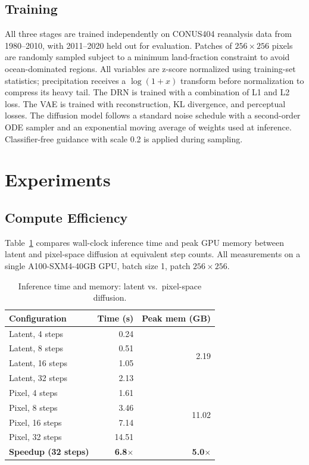 \documentclass[10pt]{article}
\begin{document}
\subsection{Training}

All three stages are trained independently on CONUS404 reanalysis data from 1980--2010, with 2011--2020 held out for evaluation. Patches of $256\times256$ pixels are randomly sampled subject to a minimum land-fraction constraint to avoid ocean-dominated regions. All variables are z-score normalized using training-set statistics; precipitation receives a $\log(1+x)$ transform before normalization to compress its heavy tail. The DRN is trained with a combination of L1 and L2 loss. The VAE is trained with reconstruction, KL divergence, and perceptual losses. The diffusion model follows a standard noise schedule with a second-order ODE sampler and an exponential moving average of weights used at inference. Classifier-free guidance with scale 0.2 is applied during sampling.

\section{Experiments}

\subsection{Compute Efficiency}
\label{sec:benchmark}

Table~\ref{tab:benchmark} compares wall-clock inference time and peak GPU memory between latent and pixel-space diffusion at equivalent step counts. All measurements on a single A100-SXM4-40GB GPU, batch size 1, patch $256\times256$.

\begin{table}[h]
\centering
\caption{Inference time and memory: latent vs.\ pixel-space diffusion.}
\label{tab:benchmark}
\begin{tabular}{lrr}
\toprule
Configuration & Time (s) & Peak mem (GB) \\
\midrule
Latent, 4 steps  & 0.24 & \multirow{4}{*}{2.19} \\
Latent, 8 steps  & 0.51 & \\
Latent, 16 steps & 1.05 & \\
Latent, 32 steps & 2.13 & \\
\midrule
Pixel, 4 steps   & 1.61 & \multirow{4}{*}{11.02} \\
Pixel, 8 steps   & 3.46 & \\
Pixel, 16 steps  & 7.14 & \\
Pixel, 32 steps  & 14.51 & \\
\midrule
\textbf{Speedup (32 steps)} & \textbf{6.8$\times$} & \textbf{5.0$\times$} \\
\bottomrule
\end{tabular}
\end{table}
\end{document}
